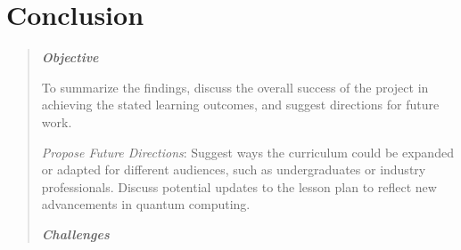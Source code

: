 \section{Conclusion}

\begin{quote}\itshape
\textbf{\emph{Objective}}

To summarize the findings, discuss the overall success of the project in achieving the stated learning outcomes, 
and suggest directions for future work. 





\emph{Propose Future Directions}: Suggest ways the curriculum could be expanded or adapted for different audiences, such as 
undergraduates or industry professionals. Discuss potential updates to the lesson plan to reflect new advancements in quantum computing.

\textbf{\emph{Challenges}}


\end{quote}\ignorespacesafterend
    
